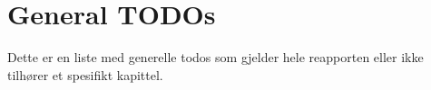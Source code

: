 
\section*{General TODOs}
	
	
	Dette er en liste med generelle todos som gjelder hele reapporten eller ikke tilhører et spesifikt kapittel. 

